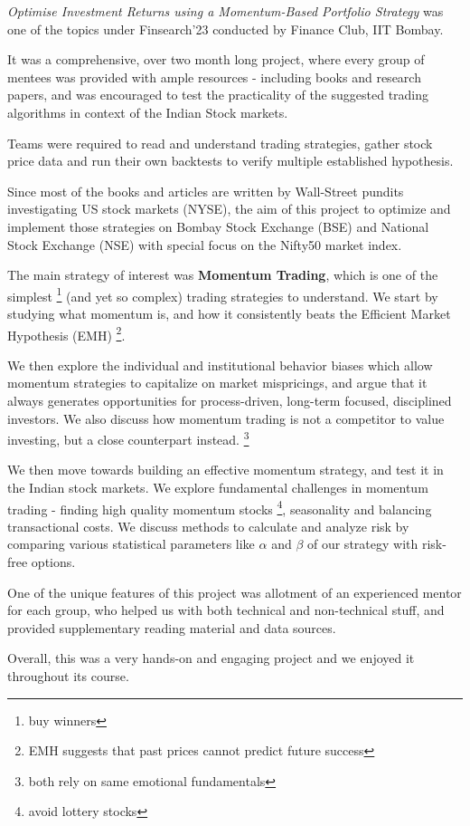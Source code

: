\emph{Optimise Investment Returns using a Momentum-Based Portfolio Strategy} was one of the topics under Finsearch'23 conducted by Finance Club, IIT Bombay.

It was a comprehensive, over two month long project, where every group of mentees was provided with ample resources - including books and research papers, and was encouraged to test the practicality of the suggested trading algorithms in context of the Indian Stock markets.

Teams were required to read and understand trading strategies, gather stock price data and run their own backtests to verify multiple established hypothesis.

Since most of the books and articles are written by Wall-Street pundits investigating US stock markets (NYSE), the aim of this project to optimize and implement those strategies on Bombay Stock Exchange (BSE) and National Stock Exchange (NSE) with special focus on the Nifty50 market index.

The main strategy of interest was \textbf{Momentum Trading}, which is one of the simplest \footnote[1]{buy winners} (and yet so complex) trading strategies to understand. We start by studying what momentum is, and how it consistently beats the Efficient Market Hypothesis (EMH) \footnote[2]{EMH suggests that past prices cannot predict future success}.

We then explore the individual and institutional behavior biases which allow momentum strategies to capitalize on market mispricings, and argue that it always generates opportunities for process-driven, long-term focused, disciplined investors. We also discuss how momentum trading is not a competitor to value investing, but a close counterpart instead. \footnote[3]{both rely on same emotional fundamentals}

We then move towards building an effective momentum strategy, and test it in the Indian stock markets. We explore fundamental challenges in momentum trading - finding high quality momentum stocks \footnote[4]{avoid lottery stocks}, seasonality and balancing transactional costs. We discuss methods to calculate and analyze risk by comparing various statistical parameters like $\alpha$ and $\beta$ of our strategy with risk-free options.

One of the unique features of this project was allotment of an experienced mentor for each group, who helped us with both technical and non-technical stuff, and provided supplementary reading material and data sources.

Overall, this was a very hands-on and engaging project and we enjoyed it throughout its course.

